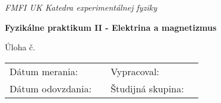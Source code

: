 \makeatletter
\begin{titlepage}
	\begin{center}
		\textit{FMFI UK Katedra experimentálnej fyziky}
		
		\vspace{15pt}
		
		{\large\textbf{Fyzikálne praktikum II - Elektrina a magnetizmus}}
		
		\vspace*{100pt}
		
		\begin{spacing}{2.5}
			{\Huge\textbf{\@title}}	
		\end{spacing}	
			
		Úloha č. \taskNumber
		
	\end{center}

	\vfill

	\noindent
	\begin{spacing}{1.15}
		\begin{table}[H]
			\begin{tabular}{p{} p{} p{} p{}}
				Dátum merania: & \measureDate & Vypracoval: & \@author \\
				Dátum odovzdania: & \submitDate & Študijná skupina: & \studyGroup
			\end{tabular}
		\end{table}
	\end{spacing}
\end{titlepage}
